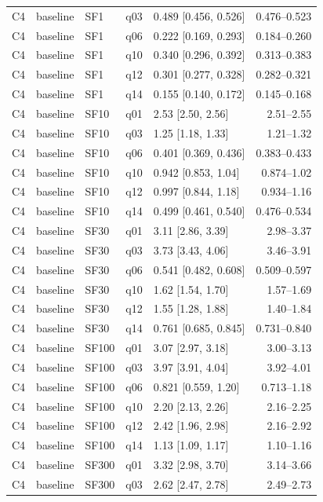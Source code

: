 \begin{longtable}{lllllr}
C4 & baseline & SF1 & q03 & 0.489 [0.456, 0.526] & 0.476--0.523 \\
C4 & baseline & SF1 & q06 & 0.222 [0.169, 0.293] & 0.184--0.260 \\
C4 & baseline & SF1 & q10 & 0.340 [0.296, 0.392] & 0.313--0.383 \\
C4 & baseline & SF1 & q12 & 0.301 [0.277, 0.328] & 0.282--0.321 \\
C4 & baseline & SF1 & q14 & 0.155 [0.140, 0.172] & 0.145--0.168 \\
C4 & baseline & SF10 & q01 & 2.53 [2.50, 2.56] & 2.51--2.55 \\
C4 & baseline & SF10 & q03 & 1.25 [1.18, 1.33] & 1.21--1.32 \\
C4 & baseline & SF10 & q06 & 0.401 [0.369, 0.436] & 0.383--0.433 \\
C4 & baseline & SF10 & q10 & 0.942 [0.853, 1.04] & 0.874--1.02 \\
C4 & baseline & SF10 & q12 & 0.997 [0.844, 1.18] & 0.934--1.16 \\
C4 & baseline & SF10 & q14 & 0.499 [0.461, 0.540] & 0.476--0.534 \\
C4 & baseline & SF30 & q01 & 3.11 [2.86, 3.39] & 2.98--3.37 \\
C4 & baseline & SF30 & q03 & 3.73 [3.43, 4.06] & 3.46--3.91 \\
C4 & baseline & SF30 & q06 & 0.541 [0.482, 0.608] & 0.509--0.597 \\
C4 & baseline & SF30 & q10 & 1.62 [1.54, 1.70] & 1.57--1.69 \\
C4 & baseline & SF30 & q12 & 1.55 [1.28, 1.88] & 1.40--1.84 \\
C4 & baseline & SF30 & q14 & 0.761 [0.685, 0.845] & 0.731--0.840 \\
C4 & baseline & SF100 & q01 & 3.07 [2.97, 3.18] & 3.00--3.13 \\
C4 & baseline & SF100 & q03 & 3.97 [3.91, 4.04] & 3.92--4.01 \\
C4 & baseline & SF100 & q06 & 0.821 [0.559, 1.20] & 0.713--1.18 \\
C4 & baseline & SF100 & q10 & 2.20 [2.13, 2.26] & 2.16--2.25 \\
C4 & baseline & SF100 & q12 & 2.42 [1.96, 2.98] & 2.16--2.92 \\
C4 & baseline & SF100 & q14 & 1.13 [1.09, 1.17] & 1.10--1.16 \\
C4 & baseline & SF300 & q01 & 3.32 [2.98, 3.70] & 3.14--3.66 \\
C4 & baseline & SF300 & q03 & 2.62 [2.47, 2.78] & 2.49--2.73 \\

\end{longtable}
